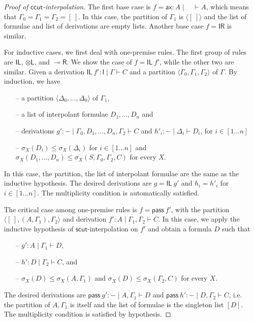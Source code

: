 \documentclass[sn-mathphys-num]{sn-jnl}%
\newcommand{\GG}{\Gamma}
\newcommand{\GD}{\Delta}
\newcommand{\vd}{\vdash}
\newcommand{\tl}{\otimes \mathsf{L}}
\newcommand{\pass}{\mathsf{pass}}
\newcommand{\unitl}{\mathsf{IL}}
\newcommand{\unitr}{\mathsf{IR}}
\newcommand{\ax}{\mathsf{ax}}
\newcommand{\lolli}{\multimap}
\newcommand{\lright}{{\lolli}\mathsf{R}}
\newcommand{\I}{\mathsf{I}}
\newcommand{\mf}[1]{\mathsf{#1}}
\newcommand{\gs}[1]{\sigma_{X} (#1)}
\theoremstyle{thmstyleone}%
\theoremstyle{thmstyletwo}%
\theoremstyle{thmstylethree}%
\begin{document}
\begin{proof}[Proof of $\mf{ccut}$-interpolation]
The first base case is $f  = \ax : A \mid \quad \vd A$, which means that $\GG_0 = \GG_1 = \GG_2 = [\ ]$.
In this case, the partition of $\GG_1$ is $\langle [\ ] \rangle$ and the list of formulae and list of derivations are empty lists.
Another base case $f = \unitr$ is similar.

For inductive cases, we first deal with one-premise rules. 
The first group of rules are $\unitl$, $\tl$, and $\lright$. 
We show the case of $f = \unitl \ f'$, while the other two are similar.
Given a derivation $\unitl \ f' : \I \mid \GG \vd C$ and a partition $\langle \GG_0 , \GG_1 , \GG_2\rangle$ of $\GG$.
By induction, we have 
\begin{itemize}
  \item[--] a partition $\langle \GD_0, \dots , \GD_0 \rangle$ of $\GG_1$, 
  \item[--] a list of interpolant formulae $D_1, \dots , D_n$ and
  \item[--] derivations $g' : {-} \mid \GG_0 , D_1 , \dots , D_n , \GG_2 \vd C$ and $h'_i : {-} \mid \GD_i \vd D_i$, for $i \in [1 \dots n]$
  \item[--]  $\gs{D_i} \leq \gs{\GD_i}$ for $i \in [1 \dots n]$ and $\gs{D_1, \dots, D_n} \leq \gs{S, \GG_0, \GG_2, C}$ for every $X$.
\end{itemize}
In this case, the partition, the list of interpolant formulae are the same as the inductive hypothesis.
The desired derivations are $g = \unitl \ g'$ and $h_i = h'_i$ for $i \in [1 \dots n]$.
The multiplicity condition is automatically satisfied.

The critical case among one-premise rules is $f = \pass \ f'$, with the partition $\langle [\ ], (A, \GG_1) , \GG_2 \rangle$ and derivation $f' : A \mid \GG_1 , \GG_2 \vd C$.
In this case, we apply the inductive hypothesis of $\mf{scut}$-interpolation on $f'$ and obtain a formula $D$ such that 
\begin{itemize}
  \item[--] $g': A \mid \GG_1 \vd D$,
  \item[--] $h' : D \mid \GG_2 \vd C$, and
  \item[--] $\gs{D} \leq \gs{A , \GG_1}$ and $\gs{D} \leq \gs{\GG_2 , C}$ for every $X$.
\end{itemize}
The desired derivations are $\pass \ g' : {-} \mid A , \GG_1 \vd D$ and $\pass \ h' : {-} \mid D, \GG_2 \vd C$, i.e. the partition of $A, \GG_1$ is itself and the list of formulae is the singleton list $[D]$.
The multiplicity condition is satisfied by hypothesis.


\end{proof}
\end{document}
